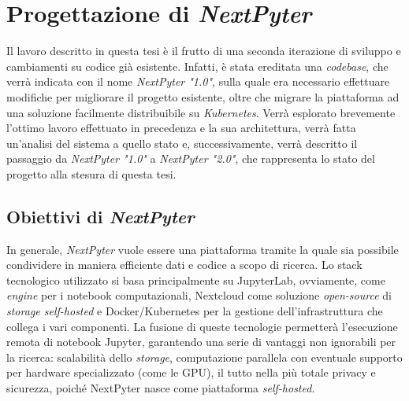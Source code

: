 \chapter{Progettazione di \textit{NextPyter}}
Il lavoro descritto in questa tesi è il frutto di una seconda iterazione di sviluppo e cambiamenti su codice già esistente. Infatti, è stata ereditata una \textit{codebase}, che verrà indicata con il nome \textit{NextPyter "1.0"}, sulla quale era necessario effettuare modifiche per migliorare il progetto esistente, oltre che migrare la piattaforma ad una soluzione facilmente distribuibile su \textit{Kubernetes}. \newline
Verrà esplorato brevemente l'ottimo lavoro effettuato in precedenza e la sua architettura, verrà fatta un'analisi del sistema a quello stato e, successivamente, verrà descritto il passaggio da \textit{NextPyter "1.0"} a \textit{NextPyter "2.0"}, che rappresenta lo stato del progetto alla stesura di questa tesi. 
\section{Obiettivi di \textit{NextPyter}}
In generale, \textit{NextPyter} vuole essere una piattaforma tramite la quale sia possibile condividere in maniera efficiente dati e codice a scopo di ricerca. 
\newline
Lo stack tecnologico utilizzato si basa principalmente su JupyterLab, ovviamente, come \textit{engine} per i notebook computazionali, Nextcloud come soluzione \textit{open-source} di \textit{storage self-hosted} e Docker/Kubernetes per la gestione dell'infrastruttura che collega i vari componenti.
\newline
La fusione di queste tecnologie permetterà l'esecuzione remota di notebook Jupyter, garantendo una serie di vantaggi non ignorabili per la ricerca: scalabilità dello \textit{storage}, computazione parallela con eventuale supporto per hardware specializzato (come le GPU), il tutto nella più totale privacy e sicurezza, poiché NextPyter nasce come piattaforma \textit{self-hosted}.

